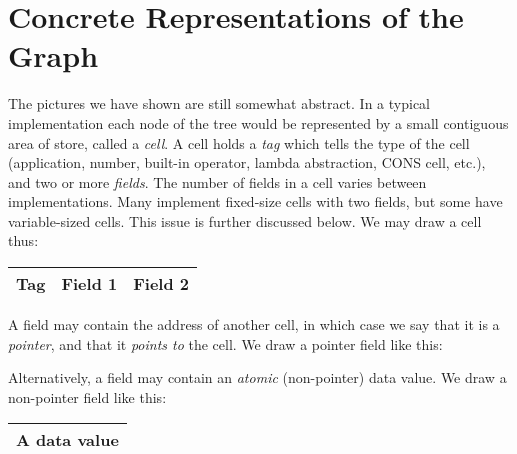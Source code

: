 \section{Concrete Representations of the Graph}

The pictures we have shown are still somewhat abstract. In a typical
implementation each node of the tree would be represented by a small
contiguous area of store, called a \textit{cell}. A cell holds a \textit{tag} which tells the type of
the cell (application, number, built-in operator, lambda abstraction, CONS
cell, etc.), and two or more \textit{fields}. The number of fields in a cell varies between
implementations. Many implement fixed-size cells with two fields, but some
have variable-sized cells. This issue is further discussed below. We may draw a
cell thus:
\begin{center}
    {%
        \setlength{\tabcolsep}{16pt}   %
        \renewcommand{\arraystretch}{1.75} %
       	\sffamily
        \footnotesize
        \begin{tabular}{|c|c|c|}
            \hline
            Tag & Field 1 & Field 2 \\
            \hline
        \end{tabular}
    }%
\end{center}

A field may contain the address of another cell, in which case we say that it
is a \textit{pointer}, and that it \textit{points to} the cell. We draw a pointer field like this:
\begin{center}
    {%
        \sffamily
        \footnotesize
    }%
\end{center}

Alternatively, a field may contain an \textit{atomic} (non-pointer) data value. We
draw a non-pointer field like this:
\begin{center}
    {%
        \setlength{\tabcolsep}{16pt}   %
        \renewcommand{\arraystretch}{1.75} %
        \sffamily
        \footnotesize
        \begin{tabular}{|c|}
            \hline
            A data value \\
            \hline
        \end{tabular}\hspace*{3cm}
    }%
\end{center}

